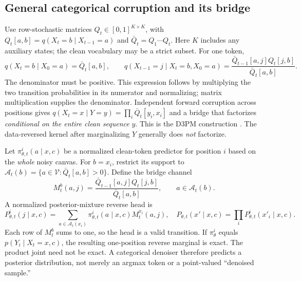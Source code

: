 \documentclass{article}
\theoremstyle{remark}\newtheorem{remark}[theorem]{Remark}
\begin{document}
\subsection{General categorical corruption and its bridge}
Use row-stochastic matrices $Q_t\in[0,1]^{K\times K}$, with
$Q_t[a,b]=q(X_t=b\mid X_{t-1}=a)$ and $\bar Q_t=Q_1\cdots Q_t$. Here $K$ includes any auxiliary states; the clean vocabulary may be a strict subset. For one token,
\begin{equation}
 q(X_t=b\mid X_0=a)=\bar Q_t[a,b],\qquad
 q(X_{t-1}=j\mid X_t=b,X_0=a)
 =\frac{\bar Q_{t-1}[a,j]Q_t[j,b]}{\bar Q_t[a,b]}.
 \label{eq:d3pmposterior}
\end{equation}
The denominator must be positive. This expression follows by multiplying the two transition probabilities in its numerator and normalizing; matrix multiplication supplies the denominator. Independent forward corruption across positions gives
$q(X_t=x\mid Y=y)=\prod_i\bar Q_t[y_i,x_i]$ and a bridge that factorizes \emph{conditional on the entire clean sequence} $y$. This is the D3PM construction \cite{d3pm}. The data-reversed kernel after marginalizing $Y$ generally does \emph{not} factorize.

Let $\pi_{\theta,t}^i(a\mid x,c)$ be a normalized clean-token predictor for position $i$ based on the \emph{whole} noisy canvas. For $b=x_i$, restrict its support to
$\mathcal A_t(b)=\{a\in\mathcal V:\bar Q_t[a,b]>0\}$. Define the bridge channel
\begin{equation}
 M_t^b(a,j)=\frac{\bar Q_{t-1}[a,j]Q_t[j,b]}{\bar Q_t[a,b]},\qquad a\in\mathcal A_t(b).
\end{equation}
A normalized posterior-mixture reverse head is
\begin{equation}
 P_{\theta,t}^i(j\mid x,c)=\sum_{a\in\mathcal A_t(x_i)}\pi_{\theta,t}^i(a\mid x,c)M_t^{x_i}(a,j),
 \quad P_{\theta,t}(x'\mid x,c)=\prod_iP_{\theta,t}^i(x'_i\mid x,c).
 \label{eq:mixturehead}
\end{equation}
Each row of $M_t^b$ sums to one, so the head is a valid transition. If $\pi_\theta^i$ equals $p(Y_i\mid X_t=x,c)$, the resulting one-position reverse marginal is exact. The product joint need not be exact. A categorical denoiser therefore predicts a posterior distribution, not merely an argmax token or a point-valued ``denoised sample.''
\end{document}
